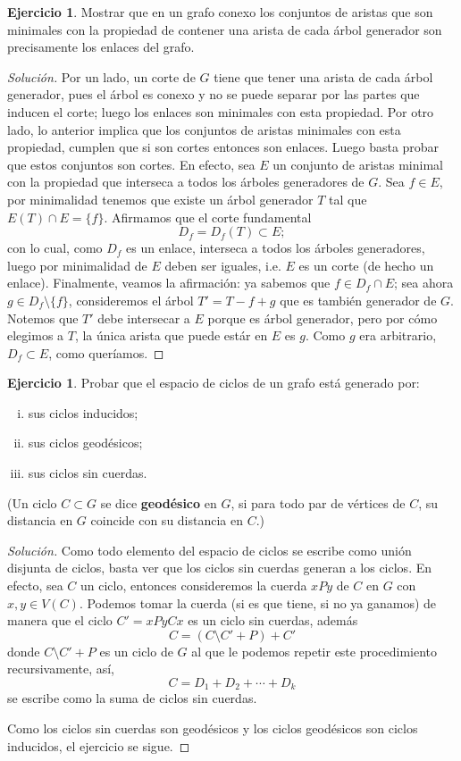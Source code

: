 \documentclass[12pt]{report}
\theoremstyle{plain}
\theoremstyle{definition}
\newtheorem{exercise}[theorem]{Ejercicio}
\newenvironment{solution}{\begin{proof}[Solución]}{\end{proof}}
\begin{document}
\begin{exercise}
Mostrar que en un grafo conexo los conjuntos de aristas que son minimales con la propiedad de contener una arista
de cada árbol generador son precisamente los enlaces del grafo.
\end{exercise}
\begin{solution}
Por un lado, un corte de $G$ tiene que tener una arista de cada árbol generador, pues el árbol es conexo y no se
puede separar por las partes que inducen el corte; luego los enlaces son minimales con esta propiedad. Por otro
lado, lo anterior implica que los conjuntos de aristas minimales con esta propiedad, cumplen que si son cortes
entonces son enlaces. Luego basta probar que estos conjuntos son cortes. En efecto, sea $E$ un conjunto de
aristas minimal con la propiedad que interseca a todos los árboles generadores de $G$. Sea $f \in E$, por
minimalidad tenemos que existe un árbol generador $T$ tal que $E(T) \cap E = \{f \}$. Afirmamos que el corte
fundamental
\[
    D_f = D_f(T) \subset E;
\]
con lo cual, como $D_f$ es un enlace, interseca a todos los árboles generadores, luego por minimalidad de $E$
deben ser iguales, i.e. $E$ es un corte (de hecho un enlace). Finalmente, veamos la afirmación: ya sabemos que $f \in D_f \cap E$; sea ahora $g \in D_f \setminus \{f\}$, consideremos el árbol $T' = T - f + g$ que es también generador de $G$. Notemos que $T'$ debe intersecar a $E$ porque es árbol generador, pero por cómo elegimos a $T$, la única arista que puede estár en $E$ es $g$. Como $g$ era arbitrario, $D_f \subset E$, como queríamos.
\end{solution}

\begin{exercise}
Probar que el espacio de ciclos de un grafo está generado por:
\begin{enumerate}[(i)]
\item sus ciclos inducidos;
\item sus ciclos geodésicos;
\item sus ciclos sin cuerdas.
\end{enumerate}
(Un ciclo $C \subset G$ se dice \textbf{geodésico} en $G$, si para todo par de vértices de $C$, su distancia en $
G$ coincide con su distancia en $C$.)
\end{exercise}
\begin{solution}
Como todo elemento del espacio de ciclos se escribe como unión disjunta de ciclos, basta ver que los ciclos
sin cuerdas generan a los ciclos. En efecto, sea $C$ un ciclo, entonces consideremos la cuerda $xPy$ de $C$ en $G$
con $x,
y \in V(C)$. Podemos tomar la cuerda (si es que tiene, si no ya ganamos) de manera que el ciclo $C' = xPyCx$ es un
ciclo sin cuerdas, además
\[
    C = (C \setminus C' + P) + C'
\]
donde $C \setminus C' + P$ es un ciclo de $G$ al que le podemos repetir este procedimiento
recursivamente, así,
\[
    C = D_1 + D_2 + \cdots + D_k
\]
se escribe como la suma de ciclos sin cuerdas.

Como los ciclos sin cuerdas son geodésicos y los ciclos geodésicos son ciclos inducidos, el ejercicio se sigue.
\end{solution}
\end{document}
